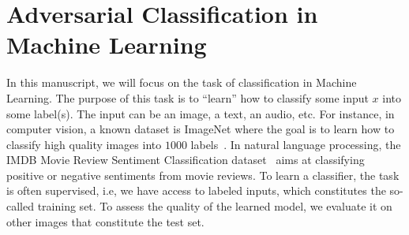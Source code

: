 



\section{Adversarial Classification in Machine Learning}

In this manuscript, we will focus on the task of classification in Machine Learning. The purpose of this task is to ``learn'' how to classify some input $x$ into some label(s). The input can be an image, a text, an audio, etc. For instance, in computer vision, a known dataset is ImageNet where the goal is to learn how to classify high quality images into $1000$ labels~\citep{imagenet_cvpr09}. In natural language processing, the IMDB Movie Review Sentiment Classification dataset~\citep{maas-EtAl:2011:ACL-HLT2011} aims at classifying positive or negative sentiments from movie reviews. To learn a classifier, the task is often supervised, i.e, we have access to labeled inputs, which constitutes the so-called training set. To assess the quality of the learned model, we evaluate it on other images that constitute the test set.

